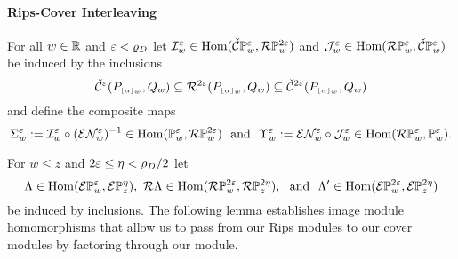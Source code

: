 \paragraph{Rips-Cover Interleaving}

For all $w\in\mathbb{R}$ and $\varepsilon < \varrho_D$ let $\mathcal{I}_w^\varepsilon\in\mathrm{Hom}(\check{\mathcal{C}}\mathbb{P}_{w}^{\varepsilon}, \mathcal{R}\mathbb{P}_{w}^{2\varepsilon})$ and $\mathcal{J}_w^\varepsilon\in\mathrm{Hom}(\mathcal{R}\mathbb{P}_{w}^{\varepsilon},\check{\mathcal{C}}\mathbb{P}_{w}^{\varepsilon})$ be induced by the inclusions
\[ \check{\mathcal{C}}^\varepsilon(P_{\scriptscriptstyle \lfloor\alpha\rfloor_{w}}, Q_w)\subseteq \mathcal{R}^{2\varepsilon}(P_{\scriptscriptstyle \lfloor\alpha\rfloor_{w}},Q_w)\subseteq \check{\mathcal{C}}^{2\varepsilon}(P_{\scriptscriptstyle \lfloor\alpha\rfloor_{w}}, Q_w)\]
and define the composite maps
\[\Sigma_w^\e := \I_w^\e\circ (\E\N_w^\e)^{-1}\in \Hom(\PP{w}{\e},\RPP{w}{2\e})\ \text{ and }\ \Upsilon_w^\e := \E\N_w^{\e}\circ \J_w^{\e}\in \Hom(\RPP{w}{\e},\PP{w}{\e}).\]


For $w\leq z$ and $2\varepsilon \leq \eta < \varrho_D / 2$ let
\[ \Lambda\in\Hom(\ext{\PP{w}{\e}}, \ext{\PP{z}{\eta}}),\ \rips\Lambda\in\Hom(\RPP{w}{2\e},\RPP{z}{2\eta}),\ \text{ and }\ \Lambda'\in\Hom(\ext{\PP{w}{2\e}},\ext{\PP{z}{2\eta}})\]
be induced by inclusions.
The following lemma establishes image module homomorphisms that allow us to pass from our Rips modules to our cover modules by factoring through our \Cech module.

